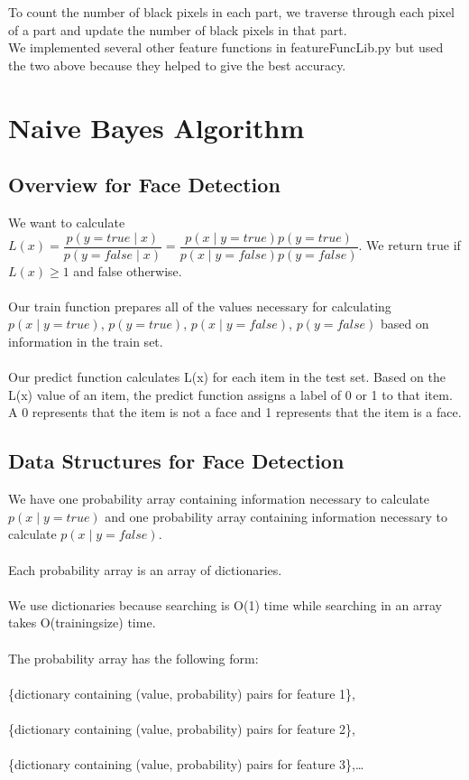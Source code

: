 \documentclass{article}
\begin{document}
To count the number of black pixels in each part, we traverse through each pixel of a part and update the number of black pixels in that part. \\
We implemented several other feature functions in featureFuncLib.py but used the two above because they helped to give the best accuracy.


\section{Naive Bayes Algorithm}

\subsection{Overview for Face Detection}

We want to calculate $L(x) =\dfrac{ p(y = true\mid x)}{p(y = f alse\mid x)} = \dfrac{p(x\mid y = true)p(y = true)}{p(x\mid y = f alse)p(y = f alse)}$. We return true if$ L(x) \geq1$ and false otherwise. \\\\
Our train function prepares all of the values necessary for calculating $p(x\mid y = true)$, $p(y = true)$, $p(x\mid y = f alse)$, $p(y = f alse)$ based on information in the train set.\\\\
Our predict function calculates L(x) for each item in the test set. Based on the L(x) value of an item, the predict function assigns a label of 0 or 1 to that item. A 0 represents that the item is not a face and 1 represents that the item is a face.
\subsection{Data Structures for Face Detection}
We have one probability array containing information necessary to calculate $p(x\mid y = true)$ and one probability array containing information necessary to calculate $p(x\mid y = false)$.\\\\
Each probability array is an array of dictionaries.\\\\
We use dictionaries because searching is O(1) time while searching in an array takes O(trainingsize) time.\\\\
The probability array has the following form:\\\\
\{dictionary containing (value, probability) pairs for feature 1\},\\\\
\{dictionary containing (value, probability) pairs for feature 2\},\\\\
\{dictionary containing (value, probability) pairs for feature 3\},…
\end{document}

